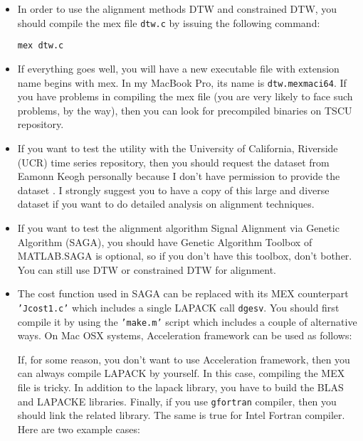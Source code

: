 \documentclass{article}
\newcommand{\parametre}[1]{\texttt{#1}}
\newcommand{\matlabfile}[1]{}
\begin{document}
\begin{itemize}
\item%
In order to use the alignment methods DTW and constrained DTW, you should compile the mex file \parametre{dtw.c} by issuing the following command:
\begin{verbatim}
mex dtw.c
\end{verbatim}

\item%
If everything goes well, you will have a new executable file with extension name begins with mex. In my MacBook Pro, its name is \verb|dtw.mexmaci64|. If you have problems in compiling the mex file (you are very likely to face such problems, by the way), then you can look for precompiled binaries on TSCU repository.

\item%
If you want to test the utility with the University of California, Riverside (UCR) time series repository, then you should request the dataset from Eamonn Keogh personally because I don't have permission to provide the dataset \cite{UCRWeb}. I strongly suggest you to have a copy of this large and diverse dataset if you want to do detailed analysis on alignment techniques.

\item%
If you want to test the alignment algorithm Signal Alignment via Genetic Algorithm (SAGA), you should have Genetic Algorithm Toolbox of MATLAB.\@ SAGA is optional, so if you don't have this toolbox, don't bother. You can still use DTW or constrained DTW for alignment.

\item%
The cost function used in SAGA can be replaced with its MEX counterpart \parametre{'Jcost1.c'} which includes a single LAPACK call \parametre{dgesv}. You should first compile it by using the \parametre{'make.m'} script which includes a couple of alternative ways. On Mac OSX systems, Acceleration framework can be used as follows:
\begin{scriptsize}
\matlabfile{tscu_manual_verbatim06.out}
\end{scriptsize}

If, for some reason, you don't want to use Acceleration framework, then you can always compile LAPACK by yourself. In this case, compiling the MEX file is tricky. In addition to the lapack library, you have to build the BLAS and LAPACKE libraries. Finally, if you use \parametre{gfortran} compiler, then you should link the related library. The same is true for Intel Fortran compiler. Here are two example cases:


\end{itemize}
\end{document}
